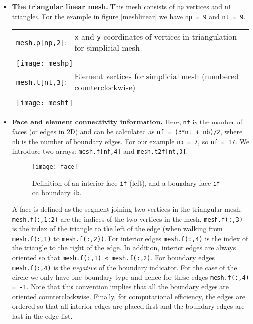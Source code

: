 \documentclass[11pt]{article}
\begin{document}
\begin{itemize}

\item {\bf The triangular linear mesh.} This mesh consists of \texttt{np} vertices and \texttt{nt} triangles. For the example in figure \ref{meshlinear} we have 
\texttt{np = 9} and \texttt{nt = 9}.

\begin{tabular}{|ll}
       	\texttt{mesh.p[np,2]}: & \texttt{x} and \texttt{y} coordinates of vertices in triangulation for simplicial mesh\\  \\ 
	
	 \multicolumn{2}{|l}{ \texttt{[image: meshp]}} \\
	 
	\texttt{mesh.t[nt,3]}: & Element vertices for simplicial mesh (numbered counterclockwise) \\  \\
	
	 \multicolumn{2}{|l}{ \texttt{[image: mesht]}}
\end{tabular}
\item {\bf Face and element connectivity information.} Here, \texttt{nf} is the number of faces (or edges in 2D) and can be calculated as
\texttt{nf  =  (3*nt + nb)/2}, where \texttt{nb} is the number of boundary edges. For our example \texttt{nb = 7}, so \texttt{nf = 17}.
We introduce two arrays: \texttt{mesh.f[nf,4]} and \texttt{mesh.t2f[nt,3]}. 

\begin{figure}[h]	
\begin{center}
	\texttt{[image: face]} 
	\end{center}
		\caption{Definition of an interior face \texttt{if} (left), and a boundary face  \texttt{if} on  boundary \texttt{ib}. }
\end{figure}


A face  is defined as the segment joining two vertices in the triangular mesh. \texttt{mesh.f(:,1:2)} are the indices of the two vertices in the mesh.
\texttt{mesh.f(:,3)} is the index of the triangle
	to the left of the edge (when walking from  \texttt{mesh.f(:,1)}  to  \texttt{mesh.f(:,2))}. For interior edges \texttt{mesh.f(:,4)} is the index of the triangle
	to the right of the edge. In addition, interior edges are always oriented so that  \texttt{mesh.f(:,1) < mesh.f(:,2)}. For boundary edges \texttt{mesh.f(:,4)} is the \emph{negative} of the boundary indicator. For the case of the circle we only have one boundary type and hence for these edges  \texttt{mesh.f(:,4) = -1}. Note that this convention implies that all the boundary edges are oriented counterclockwise.  Finally, for computational efficiency, the edges are ordered so that all interior edges are
	placed first and the boundary edges are last in the edge list. \\ \\ 
	



\end{itemize}
\end{document}
